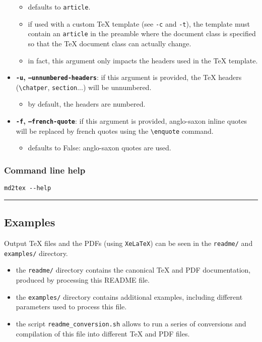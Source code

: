 \documentclass[a4paper, 12pt, twoside]{article}
\begin{document}
\begin{itemize}
\begin{itemize} 
 \item defaults to \texttt{article}.
\item if used with a custom TeX template (see \texttt{-c} and \texttt{-t}), the template must contain an \texttt{article} 	 in the preamble where the document class is specified so that the TeX document class can actually change.
\item in fact, this argument only impacts the headers used in the TeX template.
\end{itemize}
\item \textbf{\texttt{-u}, \texttt{--unnumbered-headers}}: if this argument is provided, the TeX headers (\texttt{\textbackslash{}chatper}, \texttt{section}...) will be unnumbered.
\begin{itemize} 
 \item by default, the headers are numbered.
\end{itemize}
\item \textbf{\texttt{-f}, \texttt{--french-quote}}: if this argument is provided, anglo-saxon inline quotes will be replaced by french quotes using the \texttt{\textbackslash{}enquote} command.
\begin{itemize} 
 \item defaults to False: anglo-saxon quotes are used. 
\end{itemize}
\end{itemize}
\subsubsection{Command line help}

\begin{listing}[h!]
   \begin{verbatim}
md2tex --help

   \end{verbatim}
\end{listing}

\par\noindent\rule{\linewidth}{0.4pt}
\subsection{Examples}

Output TeX files and the PDFs (using \texttt{XeLaTeX}) can be seen in the \texttt{readme/} and \texttt{examples/} directory.

\begin{itemize}
\item the \texttt{readme/} directory contains the canonical TeX and PDF documentation, produced by processing this README file.
\item the \texttt{examples/} directory contains additional examples, including different parameters used to process this file.
\item the script \texttt{readme\_conversion.sh} allows to run a series of conversions and compilation of this file into different TeX and PDF files. 
\end{itemize}
\end{document}
